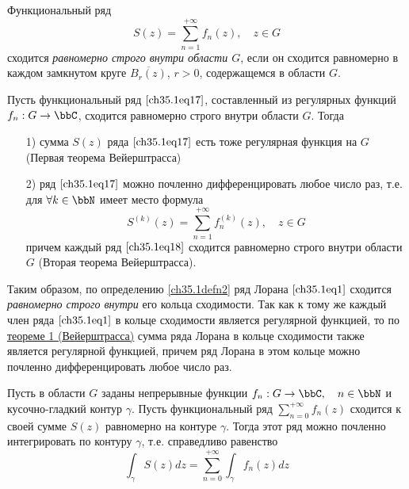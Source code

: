 \begin{defn}\label{ch35.1defn2} 
Функциональный ряд 
\begin{equation} \label{ch35.1eq17}
S(z)=\sum\limits_{n=1}^{+\infty} f_n(z), \quad z\in G
\end{equation}
 сходится \textit{равномерно строго внутри области $G$}, если он сходится равномерно в каждом замкнутом круге $\overline{B_r(z)}$, $r>0$, содержащемся в области $G$.
\end{defn}

\begin{thm}[Вейерштрасса] \label{ch35.1Thm5}
Пусть функциональный ряд $\eqref{ch35.1eq17}$, составленный из регулярных функций $f_n: G \to \bbC$, сходится равномерно строго внутри области $G$. Тогда
\begin{enumerate}
	\item[1)] {\rightskip=3.5cm} {сумма $S(z)$ ряда $\eqref{ch35.1eq17}$ есть тоже регулярная функция на $G$ (Первая теорема Вейерштрасса)
	}
	\item[2)] {\rightskip=0cm}{ряд $\eqref{ch35.1eq17}$ можно почленно дифференцировать любое число раз, т.е. для $\forall k \in \bbN$ имеет место формула 
	\begin{equation} \label{ch35.1eq18}
	S^{(k)}(z) = \sum\limits_{n=1}^{+\infty} f_{n}^{(k)}(z), \quad z \in G
	\end{equation}
	причем каждый ряд $\eqref{ch35.1eq18}$ сходится равномерно строго внутри области $G$ (Вторая теорема Вейерштрасса).	}
\end{enumerate}
\end{thm}

Таким образом, по определению \ref{ch35.1defn2} ряд Лорана $\eqref{ch35.1eq1}$ сходится \textit{равномерно строго внутри} его кольца сходимости. Так как к тому же каждый член ряда $\eqref{ch35.1eq1}$ в кольце сходимости является регулярной функцией, то по  \hyperref[ch35.1Thm5]{теореме 1 (Вейерштрасса)} сумма ряда Лорана в кольце сходимости также является регулярной функцией, причем ряд Лорана в этом кольце можно почленно дифференцировать любое число раз.

\begin{thm} \label{ch35.1Thm6}
Пусть в области $G$ заданы непрерывные функции $f_n: G \to \bbC,\quad n \in \bbN$ и кусочно-гладкий контур $\gamma$. Пусть функциональный ряд $\sum\limits_{n=0}^{+\infty} f_n(z)$ сходится к своей сумме $S(z)$ равномерно на контуре $\gamma$. Тогда этот ряд можно почленно интегрировать по контуру $\gamma$, т.е. справедливо равенство
\begin{equation}
\int_{\gamma} S(z)dz = \sum\limits_{n=0}^{+\infty} \int_{\gamma} f_n(z)dz
\end{equation}
\end{thm} 

